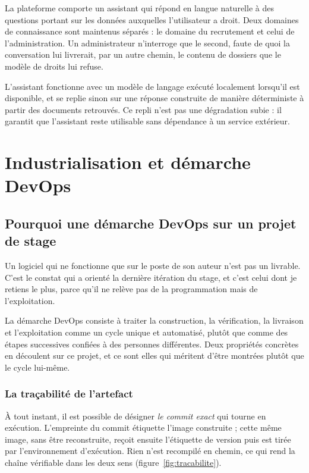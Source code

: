 \documentclass[12pt,a4paper]{report}
\begin{document}
La plateforme comporte un assistant qui répond en langue naturelle à des
questions portant sur les données auxquelles l'utilisateur a droit. Deux
domaines de connaissance sont maintenus séparés : le domaine du recrutement et
celui de l'administration. Un administrateur n'interroge que le second, faute
de quoi la conversation lui livrerait, par un autre chemin, le contenu de
dossiers que le modèle de droits lui refuse.

L'assistant fonctionne avec un modèle de langage exécuté localement lorsqu'il
est disponible, et se replie sinon sur une réponse construite de manière
déterministe à partir des documents retrouvés. Ce repli n'est pas une
dégradation subie : il garantit que l'assistant reste utilisable sans
dépendance à un service extérieur.

\chapter{Industrialisation et démarche DevOps}

\section{Pourquoi une démarche DevOps sur un projet de stage}

Un logiciel qui ne fonctionne que sur le poste de son auteur n'est pas un
livrable. C'est le constat qui a orienté la dernière itération du stage, et
c'est celui dont je retiens le plus, parce qu'il ne relève pas de la
programmation mais de l'exploitation.

La démarche DevOps consiste à traiter la construction, la vérification, la
livraison et l'exploitation comme un cycle unique et automatisé, plutôt que
comme des étapes successives confiées à des personnes différentes. Deux
propriétés concrètes en découlent sur ce projet, et ce sont elles qui méritent
d'être montrées plutôt que le cycle lui-même.

\subsection{La traçabilité de l'artefact}

À tout instant, il est possible de désigner \emph{le commit exact} qui tourne
en exécution. L'empreinte du commit étiquette l'image construite ; cette même
image, sans être reconstruite, reçoit ensuite l'étiquette de version puis est
tirée par l'environnement d'exécution. Rien n'est recompilé en chemin, ce qui
rend la chaîne vérifiable dans les deux sens (figure~\ref{fig:tracabilite}).
\end{document}
